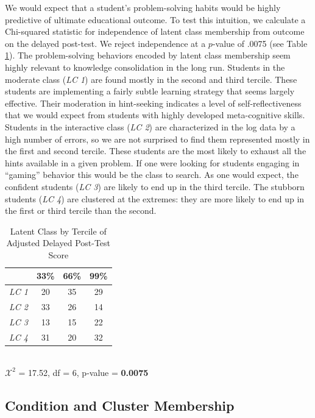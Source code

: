 \documentclass{edm_template}
\begin{document}
We would expect that a student's problem-solving habits would be highly predictive of ultimate educational outcome. To test this intuition, we calculate a Chi-squared statistic for independence of latent class membership from outcome on the delayed post-test. We reject independence at a $p$-value of .0075 (see Table \ref{tab:lc-by-score}). The problem-solving behaviors encoded by latent class membership seem highly relevant to knowledge consolidation in the long run. Students in the moderate class (\emph{LC 1}) are found mostly in the second and third tercile. These students are implementing a fairly subtle learning strategy that seems largely effective. Their moderation in hint-seeking indicates a level of self-reflectiveness that we would expect from students with highly developed meta-cognitive skills. Students in the interactive class (\emph{LC 2}) are characterized in the log data by a high number of errors, so we are not surprised to find them represented mostly in the first and second tercile. These students are the most likely to exhaust all the hints available in a given problem. If one were looking for students engaging in ``gaming'' behavior this would be the class to search. As one would expect, the confident  students (\emph{LC 3}) are likely to end up in the third tercile. The stubborn students (\emph{LC 4}) are clustered at the extremes: they are more likely to end up in the first or third tercile than the second. 

\begin{table}[hbtp]
\caption{Latent Class by Tercile of Adjusted Delayed Post-Test Score}
\begin{center}
\begin{tabular}{|l || c | c | c |}
\hline
&33\%&66\%&99\%\\ \hline \hline
  \emph{LC 1}  &   20& 35& 29 \\ \hline
  \emph{LC 2}&   33& 26& 14 \\ \hline
\emph{LC 3}& 13& 15& 22 \\ \hline
  \emph{LC 4} & 31& 20& 32 \\ \hline
 \end{tabular}
\\$\mathcal{X}^2$ = 17.52, df = 6, p-value = {\bf 0.0075}
\end{center}
\label{tab:lc-by-score}
\end{table}

\subsection{Condition and Cluster Membership}
\end{document}
